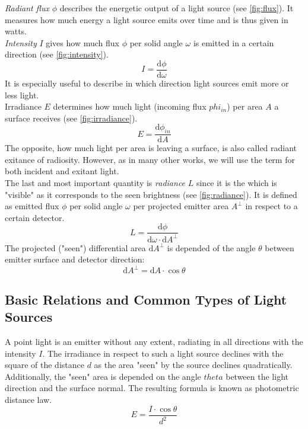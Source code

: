 \documentclass[thesis.tex]{subfiles}
\begin{document}
\emph{Radiant flux} $\phi$ describes the energetic output of a light source (see \autoref{fig:flux}).
It measures how much energy a light source emits over time and is thus given in watts.
\\
\emph{Intensity} $I$ gives how much flux $\phi$ per solid angle $\omega$ is emitted in a certain direction (see \autoref{fig:intensity}).
\begin{equation}
I = \frac{\mathrm{d}\phi}{\mathrm{d}\omega}
\end{equation}
It is especially useful to describe in which direction light sources emit more or less light.
\\
Irradiance $E$ determines how much light (incoming flux $phi_{in}$) per area $A$ a surface receives (see \autoref{fig:irradiance}).
\begin{equation}
E = \frac{\mathrm{d}\phi_{in}}{\mathrm{d}A}
\end{equation}
The opposite, how much light per area is leaving a surface, is also called radiant exitance of radiosity.
However, as in many other works, we will use the term for both incident and exitant light.
\\
The last and most important quantity is \emph{radiance} $L$ since it is the which is "visible" as it corresponds to the seen brightness (see \autoref{fig:radiance}).
It is defined as emitted flux $\phi$ per solid angle $\omega$ per projected emitter area $A^\perp$ in respect to a certain detector.
\begin{equation}
L = \frac{\mathrm{d}\phi}{\mathrm{d}\omega \cdot \mathrm{d}A^\perp }
\end{equation}
The projected ("seen") differential area $\mathrm{d}A^\perp$ is depended of the angle $\theta$ between emitter surface and detector direction:
\begin{equation}
\mathrm{d}A^\perp = \mathrm{d}A \cdot \cos\theta
\end{equation}


\subsection{Basic Relations and Common Types of Light Sources}
A point light is an emitter without any extent, radiating in all directions with the intensity $I$.
The irradiance in respect to such a light source declines with the square of the distance $d$ as the area "seen" by the source declines quadratically.
Additionally, the "seen" area is depended on the angle $theta$ between the light direction and the surface normal.
The resulting formula is known as photometric distance law.
\begin{equation}
E = \frac{I \cdot \cos\theta}{d^2}
\end{equation}
\end{document}
